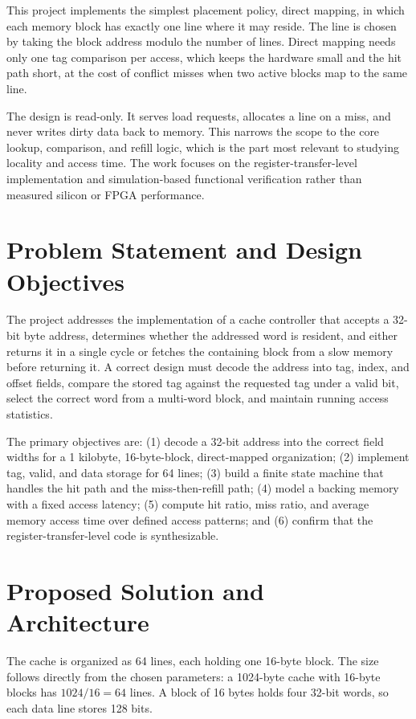 \documentclass[conference]{IEEEtran}
\begin{document}
This project implements the simplest placement policy, direct mapping, in which each memory block has exactly one line where it may reside. The line is chosen by taking the block address modulo the number of lines. Direct mapping needs only one tag comparison per access, which keeps the hardware small and the hit path short, at the cost of conflict misses when two active blocks map to the same line.

The design is read-only. It serves load requests, allocates a line on a miss, and never writes dirty data back to memory. This narrows the scope to the core lookup, comparison, and refill logic, which is the part most relevant to studying locality and access time. The work focuses on the register-transfer-level implementation and simulation-based functional verification rather than measured silicon or FPGA performance.

\section{Problem Statement and Design Objectives}
The project addresses the implementation of a cache controller that accepts a 32-bit byte address, determines whether the addressed word is resident, and either returns it in a single cycle or fetches the containing block from a slow memory before returning it. A correct design must decode the address into tag, index, and offset fields, compare the stored tag against the requested tag under a valid bit, select the correct word from a multi-word block, and maintain running access statistics.

The primary objectives are: (1) decode a 32-bit address into the correct field widths for a 1 kilobyte, 16-byte-block, direct-mapped organization; (2) implement tag, valid, and data storage for 64 lines; (3) build a finite state machine that handles the hit path and the miss-then-refill path; (4) model a backing memory with a fixed access latency; (5) compute hit ratio, miss ratio, and average memory access time over defined access patterns; and (6) confirm that the register-transfer-level code is synthesizable.

\section{Proposed Solution and Architecture}
The cache is organized as 64 lines, each holding one 16-byte block. The size follows directly from the chosen parameters: a 1024-byte cache with 16-byte blocks has $1024/16 = 64$ lines. A block of 16 bytes holds four 32-bit words, so each data line stores 128 bits.
\end{document}

